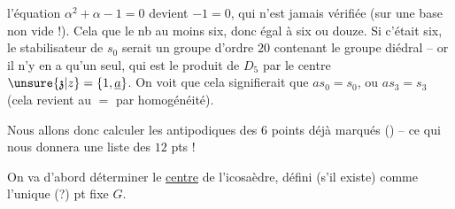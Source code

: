 l'équation $\alpha^2+\alpha-1=0$ devient $-1=0$, qui n'est jamais vérifiée (sur une base non vide !). Cela  que le nb   au moins six, donc égal à six ou douze. Si c'était  six, le stabilisateur de $s_0$ serait un groupe d'ordre $20$ contenant le groupe diédral  -- or il n'y en a qu'un seul, qui est le produit de $D_5$ par le centre $\unsure{\mathfrak{z}|z}=\{1,\underline{a}\}$. On voit que cela signifierait que $as_0=s_0$, ou $as_3=s_3$ (cela revient au $=$ par homogénéité).

Nous allons donc calculer les antipodiques des $6$ points déjà marqués () -- ce qui nous donnera une liste des $12$ pts !

On va d'abord déterminer le \uline{centre} de l'icosaèdre, défini (s'il existe) comme l'unique (?) pt fixe  $G$.

